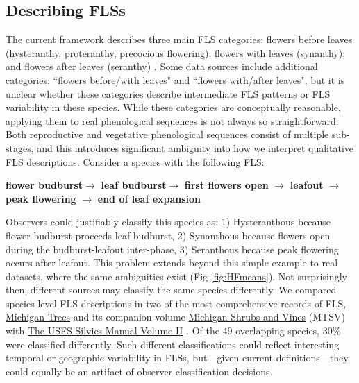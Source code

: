 \documentclass{article}
\begin{document}
\subsection*{Describing FLSs}
\noindent  The current framework describes three main FLS categories: flowers before leaves (hysteranthy, proteranthy, precocious flowering); flowers with leaves (synanthy); and flowers after leaves (seranthy) \citep{Lamont2011, Heinig1899}. Some data sources \citep[e.g.][]{Burns1990,Barnes2004} include additional categories: ``flowers before/with leaves" and ``flowers with/after leaves", but it is unclear whether these categories describe intermediate FLS patterns or FLS variability in these species. While these categories are conceptually reasonable, applying them to real phenological sequences is not always so straightforward.\\

\noindent Both reproductive and vegetative phenological sequences consist of multiple sub-stages, and this introduces significant ambiguity into how we interpret qualitative FLS descriptions. Consider a species with the following FLS:\\

\begin{center}
\textbf{flower budburst}$\rightarrow$ \textbf{leaf budburst}$\rightarrow$ \textbf{first flowers open} $\rightarrow$ \textbf{leafout} $\rightarrow$ \textbf{peak flowering} $\rightarrow$ \textbf{end of leaf expansion} \\
\end{center}

\noindent Observers could justifiably classify this species as: 1) Hysteranthous because flower budburst proceeds leaf budburst, 2) Synanthous because flowers open during the budburst-leafout inter-phase, 3) Seranthous because peak flowering occurs after leafout. This problem extends beyond this simple example to real datasets, \citep[e.g.][]{OKeefe2015} where the same ambiguities exist (Fig \ref{fig:HFmeans}). Not surprisingly then, different sources may classify the same species differently. We compared species-level FLS descriptions in two of the most comprehensive records of FLS, \underline{Michigan Trees} and its companion volume \underline{Michigan Shrubs and Vines} (MTSV) \citep{Barnes2004,Barnes2016} with \underline{The USFS Silvics Manual Volume II} \citep{Burns1990}. Of the 49 overlapping species, 30\% were classified differently. Such different classifications could reflect interesting temporal or geographic variability in FLSs, but---given current definitions---they could equally be an artifact of observer classification decisions.\\
\end{document}
